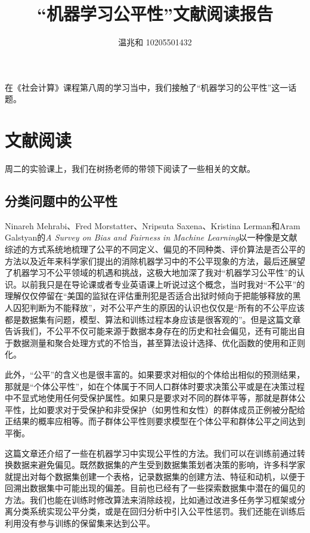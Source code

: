 \documentclass{article}
\title{“机器学习公平性”文献阅读报告}
\author{温兆和 10205501432}
\begin{document}
\maketitle

在《社会计算》课程第八周的学习当中，我们接触了“机器学习的公平性”这一话题。

\section{文献阅读}
周二的实验课上，我们在树扬老师的带领下阅读了一些相关的文献。

\subsection{分类问题中的公平性}

Ninareh Mehrabi、Fred Morstatter、Nripsuta Saxena、Kristina Lerman和Aram Galstyan的\textit{A Survey on Bias and Fairness in Machine Learning}\cite{1}以一种像是文献综述的方式系统地梳理了公平的不同定义、偏见的不同种类、评价算法是否公平的方法以及近年来科学家们提出的消除机器学习中的不公平现象的方法，最后还展望了机器学习不公平领域的机遇和挑战，这极大地加深了我对“机器学习公平性”的认识。以前我只是在导论课或者专业英语课上听说过这个概念，当时我对“不公平”的理解仅仅停留在“美国的监狱在评估重刑犯是否适合出狱时倾向于把能够释放的黑人囚犯判断为不能释放”，对不公平产生的原因的认识也仅仅是“所有的不公平应该都是数据集有问题，模型、算法和训练过程本身应该是很客观的”。但是这篇文章告诉我们，不公平不仅可能来源于数据本身存在的历史和社会偏见，还有可能出自于数据测量和聚合处理方式的不恰当，甚至算法设计选择、优化函数的使用和正则化。

此外，“公平”的含义也是很丰富的。如果要求对相似的个体给出相似的预测结果，那就是“个体公平性”，如在个体属于不同人口群体时要求决策公平或是在决策过程中不显式地使用任何受保护属性。如果只是要求对不同的群体平等，那就是群体公平性，比如要求对于受保护和非受保护（如男性和女性）的群体成员正例被分配给正结果的概率应相等。而子群体公平性则要求模型在个体公平和群体公平之间达到平衡。

这篇文章还介绍了一些在机器学习中实现公平性的方法。我们可以在训练前通过转换数据来避免偏见。既然数据集的产生受到数据集策划者决策的影响，许多科学家就提出对每个数据集创建一个表格，记录数据集的创建方法、特征和动机，以便于回溯出数据集中可能出现的偏差。目前也已经有了一些探索数据集中潜在的偏见的方法。我们也能在训练时修改算法来消除歧视，比如通过改进多任务学习框架或分离分类系统实现公平分类，或是在回归分析中引入公平性惩罚。我们还能在训练后利用没有参与训练的保留集来达到公平。
\end{document}
